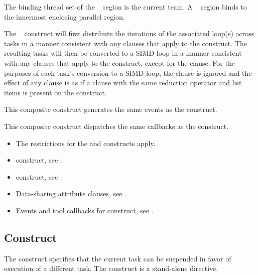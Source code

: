 \binding
The binding thread set of the ~ region is the current team. A ~ region binds to the innermost enclosing parallel region.

\descr
The ~ construct will first distribute the iterations of the associated loop(s) across tasks in a manner consistent with any clauses that apply to the  construct. The resulting tasks will then be converted to a SIMD loop in a manner consistent with any clauses that apply to the  construct, except for the  clause. For the purposes of each task's conversion to a SIMD loop, the  clause is ignored and the effect of any  clause is as if a  clause with the same reduction operator and list items is present on the construct.

\events

This composite construct generates the same events as the  construct.

\tools

This composite construct dispatches the same callbacks as the  construct.

\restrictions
\begin{itemize}
\item The restrictions for the  and  constructs apply.
\end{itemize}

\crossreferences
\begin{itemize}
\item {} construct, see .
\item {} construct, see .
\item Data-sharing attribute clauses, see .
\item Events and tool callbacks for  construct, see
.

\end{itemize}




%
%
\subsection{ Construct}
\label{subsec:taskyield Construct}
\summary
The  construct specifies that the current task can be suspended in favor of
execution of a different task. The  construct is a stand-alone directive.

